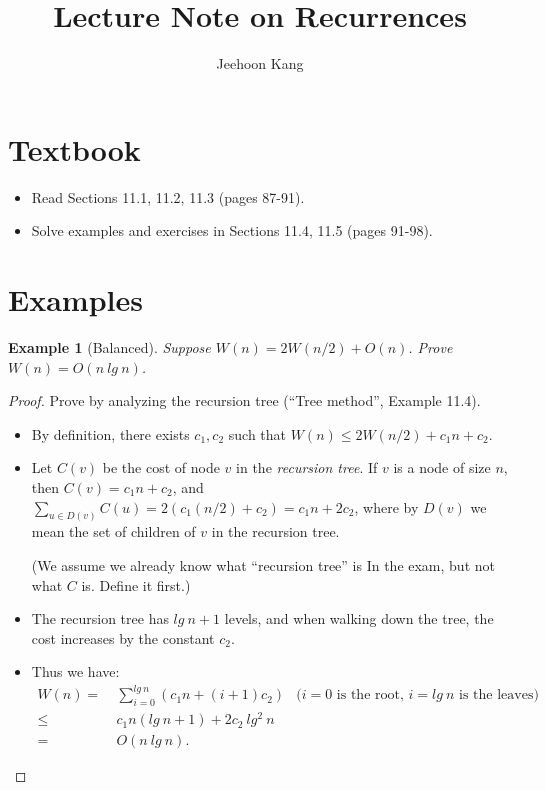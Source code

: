 \documentclass[11pt,a4paper,oneside,microtype,nokorean]{oblivoir}
\newtheorem{example}{Example}
\begin{document}
\title{Lecture Note on Recurrences}
\author{Jeehoon Kang}
\maketitle

\section{Textbook}

\begin{itemize}
\item Read Sections 11.1, 11.2, 11.3 (pages 87-91).
\item Solve examples and exercises in Sections 11.4, 11.5 (pages 91-98).
\end{itemize}


\section{Examples}


\begin{example}[Balanced] Suppose $W(n) = 2W(n/2) + O(n)$.  Prove $W(n) = O(n~lg~n)$.
\end{example}

\begin{proof}
  Prove by analyzing the recursion tree (``Tree method'', Example 11.4).

  \begin{itemize}
  \item By definition, there exists $c_1,c_2$ such that $W(n) \le 2W(n/2) + c_1 n + c_2.$
  \item Let $C(v)$ be the cost of node $v$ in the \emph{recursion tree}.  If $v$ is a node of size
    $n$, then $C(v) = c_1 n + c_2$, and
    $\sum_{u \in D(v)} C(u) = 2(c_1 (n/2) + c_2) = c_1 n + 2 c_2$, where by $D(v)$ we mean the set
    of children of $v$ in the recursion tree.

    (We assume we already know what ``recursion tree'' is In the exam, but not what $C$ is.  Define
    it first.)
  \item The recursion tree has $lg~n + 1$ levels, and when walking down the tree, the cost increases
    by the constant $c_2$.
  \item Thus we have:
    \begin{align*}
      W(n)
      = &~ \sum_{i=0}^{lg~n} (c_1 n + (i+1) c_2) & \mbox{($i=0$ is the root, $i=lg~n$ is the
                                                   leaves)} \\
      \le &~ c_1 n (lg~n + 1) + 2 c_2~lg^2~n \\
      = &~ O(n~lg~n).
    \end{align*}
  \end{itemize}
\end{proof}
\end{document}
